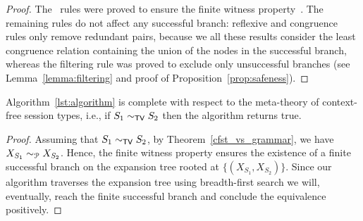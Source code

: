 \begin{proof}
	The \BPA\ rules were proved to ensure the finite witness 
	property~\cite{janvcar1999techniques}. The remaining rules do not
	affect any successful branch: reflexive and congruence rules only remove 
	redundant pairs, because we all these results consider the least 
	congruence relation containing the union of the nodes in the 
	successful branch, whereas the filtering rule was proved to exclude 
	only unsuccessful branches (see Lemma~\ref{lemma:filtering} and proof 
	of Proposition~\ref{prop:safeness}).
\end{proof}

\begin{theorem}
	Algorithm~\ref{lst:algorithm} is complete with respect to the meta-theory 
	of context-free session types, i.e., if $S_1 \sim_{\mathsf{TV}} S_2$ then 
	the algorithm returns \textsf{true}.
\end{theorem}

\begin{proof}
	Assuming that $S_1 \sim_{\mathsf{TV}} S_2$, by Theorem~\ref{cfst_vs_grammar}, we 
	have $X_{S_1} \sim_{\mathcal{P}} X_{S_2}$. Hence, the finite witness property 
	ensures the existence of a finite successful branch on the expansion 
	tree rooted at $\{(X_{S_1},  X_{S_2})\}$. Since our algorithm traverses 
	the expansion tree using breadth-first search we will, eventually, 
	reach the finite successful branch and conclude the equivalence positively.
\end{proof}
